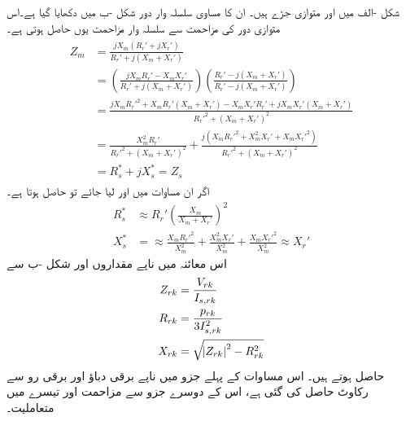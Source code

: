شکل  -الف میں   اور  متوازی جڑے ہیں۔ ان کا مساوی سلسلہ وار دور شکل -ب میں دکھایا گیا ہے۔اس متوازی دور کی مزاحمت  سے سلسلہ وار مزاحمت   یوں حاصل ہوتی ہے۔
\begin{gather}
\begin{aligned}
Z_m&=\frac{j X_m (R_r'+j X_r')}{R_r'+j(X_m+X_r')}\\
&=\left( \frac{j X_m R_r' -X_m X_r'}{R_r'+j(X_m+X_r')} \right) \left( \frac{R_r'-j(X_m+X_r')}{R_r'-j(X_m+X_r')}\right)\\
&=\frac{jX_m R_r'^2+X_m R_r'(X_m+X_r')-X_m X_r' R_r' +j X_m X_r'(X_m+X_r')}{R_r'^2+(X_m+X_r')^2}\\
&=\frac{X_m^2 R_r'}{R_r'^2+(X_m+X_r')^2}+\frac{j(X_m R_r'^2+X_m^2 X_r'+X_m X_r'^2)}{R_r'^2+(X_m+X_r')^2}\\
&=R_s^*+j X_s^* =Z_s
\end{aligned}
\end{gather}
اگر ان مساوات میں  اور   لیا جائے تو حاصل ہوتا ہے۔
\begin{align}\label{مساوات_امالی_تقریبا_مزاحمت}
R_s^*& \approx R_r' \left(\frac{X_m}{X_m+X_r'} \right)^2 \\
X_s^*&= \approx  \frac{X_m R_r'^2}{X_m^2}+\frac{X_m^2 X_r'}{X_m^2}+\frac{X_m X_r'^2}{X_m^2} \approx X_r'
\end{align}
اس معائنہ میں ناپے مقداروں اور شکل -ب سے
\begin{gather}
\begin{aligned}
Z_{rk} &=\frac{V_{rk}}{I_{s,rk}}\\
R_{rk}&=\frac{p_{rk}}{3 I_{s,rk}^2}\\
X_{rk}&=\sqrt{\abs{Z_{rk}}^2-R_{rk}^2}
\end{aligned}
\end{gather}
حاصل ہوتے ہیں۔ اس مساوات کے پہلے جزو میں ناپے برقی دباؤ اور برقی رو سے رکاوٹ حاصل کی گئی ہے، اس کے دوسرے جزو سے مزاحمت اور تیسرے میں متعاملیت۔

